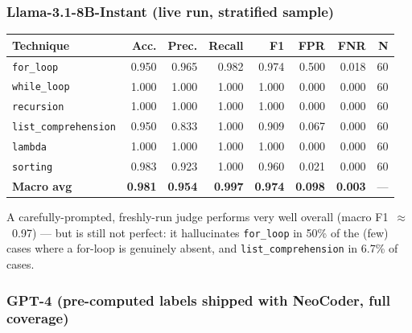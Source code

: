 \documentclass{article}
\begin{document}
\subsubsection{Llama-3.1-8B-Instant (live run, stratified sample)}

\begin{center}
\begin{tabular}{lrrrrrrr}
\toprule
\textbf{Technique} & \textbf{Acc.} & \textbf{Prec.} & \textbf{Recall} & \textbf{F1} & \textbf{FPR} & \textbf{FNR} & \textbf{N} \\
\midrule
\texttt{for\_loop}           & 0.950 & 0.965 & 0.982 & 0.974 & 0.500 & 0.018 & 60 \\
\texttt{while\_loop}         & 1.000 & 1.000 & 1.000 & 1.000 & 0.000 & 0.000 & 60 \\
\texttt{recursion}           & 1.000 & 1.000 & 1.000 & 1.000 & 0.000 & 0.000 & 60 \\
\texttt{list\_comprehension} & 0.950 & 0.833 & 1.000 & 0.909 & 0.067 & 0.000 & 60 \\
\texttt{lambda}              & 1.000 & 1.000 & 1.000 & 1.000 & 0.000 & 0.000 & 60 \\
\texttt{sorting}             & 0.983 & 0.923 & 1.000 & 0.960 & 0.021 & 0.000 & 60 \\
\midrule
\textbf{Macro avg} & \textbf{0.981} & \textbf{0.954} & \textbf{0.997} & \textbf{0.974} & \textbf{0.098} & \textbf{0.003} & --- \\
\bottomrule
\end{tabular}
\end{center}

A carefully-prompted, freshly-run judge performs very well overall
(macro F1~$\approx$~0.97) --- but is still not perfect: it hallucinates
\texttt{for\_loop} in 50\% of the (few) cases where a for-loop is genuinely
absent, and \texttt{list\_comprehension} in 6.7\% of cases.

\subsubsection{GPT-4 (pre-computed labels shipped with NeoCoder, full coverage)}
\end{document}
